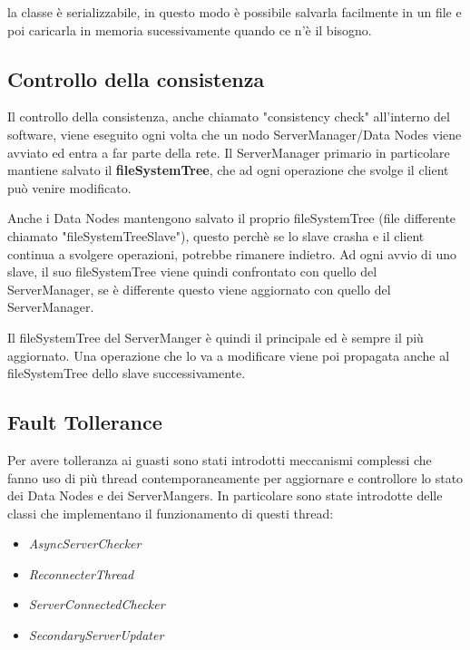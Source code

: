 \documentclass[]{article}
\begin{document}
\vspace{0.5cm}

la classe è serializzabile, in questo modo è possibile salvarla facilmente in un file e poi caricarla in memoria sucessivamente quando ce n'è il bisogno.

\subsection{Controllo della consistenza}

Il controllo della consistenza, anche chiamato "consistency check" all'interno del software, viene eseguito ogni volta che un nodo ServerManager/Data Nodes viene avviato ed entra a far parte della rete. Il ServerManager primario in particolare mantiene salvato il \textbf{fileSystemTree}, che ad ogni operazione che svolge il client può venire modificato. 

\vspace{0.2cm}
Anche i Data Nodes mantengono salvato il proprio fileSystemTree (file differente chiamato "fileSystemTreeSlave"), questo perchè se lo slave crasha e il client continua a svolgere operazioni, potrebbe rimanere indietro. Ad ogni avvio di uno slave, il suo fileSystemTree viene quindi confrontato con quello del ServerManager, se è differente questo viene aggiornato con quello del ServerManager.


\vspace{0.3cm}

Il fileSystemTree del ServerManger è quindi il principale ed è sempre il più aggiornato. Una operazione che lo va a modificare viene poi propagata anche al fileSystemTree dello slave successivamente.

\subsection{Fault Tollerance}

Per avere tolleranza ai guasti sono stati introdotti meccanismi complessi che fanno uso di più thread contemporaneamente per aggiornare e controllore lo stato dei Data Nodes e dei ServerMangers. In particolare sono state introdotte delle classi che implementano il funzionamento di questi thread:

\begin{itemize}
	\item  \textit{AsyncServerChecker}
	\item  \textit{ReconnecterThread}
	\item  \textit{ServerConnectedChecker}
	\item  \textit{SecondaryServerUpdater}
\end{itemize}
\end{document}
